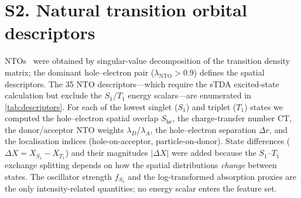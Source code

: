 \documentclass[twoside,twocolumn,9pt]{extarticle}
\begin{document}
\section*{S2. Natural transition orbital descriptors}
NTOs~\cite{Martin2003} were obtained by singular-value decomposition of the
transition density matrix; the dominant hole--electron pair
($\lambda_\text{NTO}>0.9$) defines the spatial descriptors. The \num{35}
NTO descriptors---which require the sTDA excited-state calculation but exclude the
$S_1$/$T_1$ energy scalars---are enumerated in \cref{tab:descriptors}. For each of
the lowest singlet ($S_1$) and triplet ($T_1$) states we computed the
hole--electron spatial overlap $S_\text{he}$, the charge-transfer number CT, the
donor/acceptor NTO weights $\lambda_D$/$\lambda_A$, the hole--electron separation
$\Delta r$, and the localisation indices (hole-on-acceptor, particle-on-donor).
State differences ($\Delta X = X_{S_1}-X_{T_1}$) and their magnitudes $|\Delta X|$
were added because the $S_1$--$T_1$ exchange splitting depends on how the spatial
distributions \emph{change} between states. The oscillator strength $f_{S_1}$ and the
log-transformed absorption proxies are the only intensity-related quantities; no
energy scalar enters the feature set.
\end{document}
